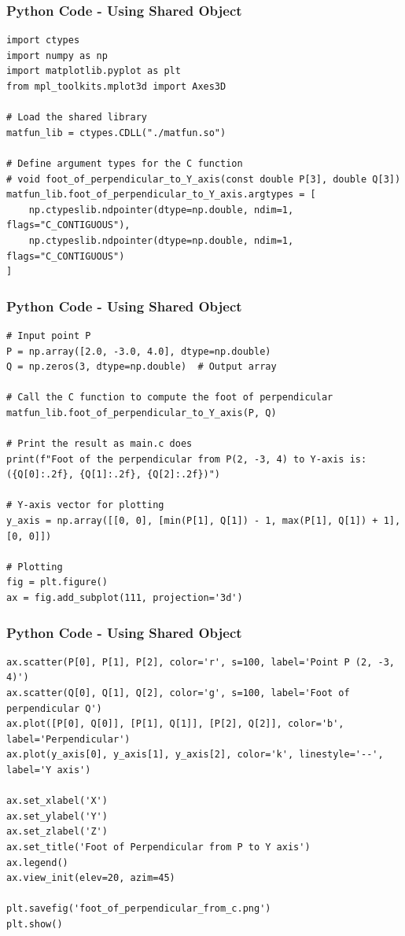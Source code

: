 \documentclass{beamer}
\numberwithin{equation}{section}
\begin{document}
\begin{frame}[fragile]
    \frametitle{Python Code - Using Shared Object}
    \begin{lstlisting}
import ctypes
import numpy as np
import matplotlib.pyplot as plt
from mpl_toolkits.mplot3d import Axes3D

# Load the shared library
matfun_lib = ctypes.CDLL("./matfun.so")

# Define argument types for the C function
# void foot_of_perpendicular_to_Y_axis(const double P[3], double Q[3])
matfun_lib.foot_of_perpendicular_to_Y_axis.argtypes = [
    np.ctypeslib.ndpointer(dtype=np.double, ndim=1, flags="C_CONTIGUOUS"),
    np.ctypeslib.ndpointer(dtype=np.double, ndim=1, flags="C_CONTIGUOUS")
]

\end{lstlisting}
\end{frame}

\begin{frame}[fragile]
    \frametitle{Python Code - Using Shared Object}
    \begin{lstlisting}
# Input point P
P = np.array([2.0, -3.0, 4.0], dtype=np.double)
Q = np.zeros(3, dtype=np.double)  # Output array

# Call the C function to compute the foot of perpendicular
matfun_lib.foot_of_perpendicular_to_Y_axis(P, Q)

# Print the result as main.c does
print(f"Foot of the perpendicular from P(2, -3, 4) to Y-axis is: ({Q[0]:.2f}, {Q[1]:.2f}, {Q[2]:.2f})")

# Y-axis vector for plotting
y_axis = np.array([[0, 0], [min(P[1], Q[1]) - 1, max(P[1], Q[1]) + 1], [0, 0]])

# Plotting
fig = plt.figure()
ax = fig.add_subplot(111, projection='3d')

\end{lstlisting}
\end{frame}
\begin{frame}[fragile]
    \frametitle{Python Code - Using Shared Object}
    \begin{lstlisting}
ax.scatter(P[0], P[1], P[2], color='r', s=100, label='Point P (2, -3, 4)')
ax.scatter(Q[0], Q[1], Q[2], color='g', s=100, label='Foot of perpendicular Q')
ax.plot([P[0], Q[0]], [P[1], Q[1]], [P[2], Q[2]], color='b', label='Perpendicular')
ax.plot(y_axis[0], y_axis[1], y_axis[2], color='k', linestyle='--', label='Y axis')

ax.set_xlabel('X')
ax.set_ylabel('Y')
ax.set_zlabel('Z')
ax.set_title('Foot of Perpendicular from P to Y axis')
ax.legend()
ax.view_init(elev=20, azim=45)

plt.savefig('foot_of_perpendicular_from_c.png')
plt.show()


\end{lstlisting}
\end{frame}
\end{document}
